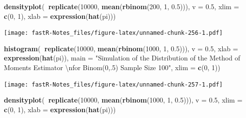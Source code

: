\documentclass[]{book}
\newenvironment{Shaded}{\begin{snugshade}}{\end{snugshade}}
\newcommand{\KeywordTok}[1]{\textcolor[rgb]{0.13,0.29,0.53}{\textbf{#1}}}
\newcommand{\DataTypeTok}[1]{\textcolor[rgb]{0.13,0.29,0.53}{#1}}
\newcommand{\DecValTok}[1]{\textcolor[rgb]{0.00,0.00,0.81}{#1}}
\newcommand{\FloatTok}[1]{\textcolor[rgb]{0.00,0.00,0.81}{#1}}
\newcommand{\CharTok}[1]{\textcolor[rgb]{0.31,0.60,0.02}{#1}}
\newcommand{\StringTok}[1]{\textcolor[rgb]{0.31,0.60,0.02}{#1}}
\newcommand{\OperatorTok}[1]{\textcolor[rgb]{0.81,0.36,0.00}{\textbf{#1}}}
\newcommand{\NormalTok}[1]{#1}
\theoremstyle{definition}
\theoremstyle{definition}
\theoremstyle{definition}
\theoremstyle{remark}
\begin{document}
\begin{Shaded}
\begin{Highlighting}[]
\KeywordTok{densityplot}\NormalTok{(}\OperatorTok{~}\KeywordTok{replicate}\NormalTok{(}\DecValTok{10000}\NormalTok{, }\KeywordTok{mean}\NormalTok{(}\KeywordTok{rbinom}\NormalTok{(}\DecValTok{200}\NormalTok{, }\DecValTok{1}\NormalTok{, }\FloatTok{0.5}\NormalTok{))), }\DataTypeTok{v =} \FloatTok{0.5}\NormalTok{, }\DataTypeTok{xlim =} \KeywordTok{c}\NormalTok{(}\DecValTok{0}\NormalTok{, }
    \DecValTok{1}\NormalTok{), }\DataTypeTok{xlab =} \KeywordTok{expression}\NormalTok{(}\KeywordTok{hat}\NormalTok{(pi)))}
\end{Highlighting}
\end{Shaded}

\texttt{[image: fastR-Notes\_files/figure-latex/unnamed-chunk-256-1.pdf]}

\begin{Shaded}
\begin{Highlighting}[]
\KeywordTok{histogram}\NormalTok{(}\OperatorTok{~}\KeywordTok{replicate}\NormalTok{(}\DecValTok{10000}\NormalTok{, }\KeywordTok{mean}\NormalTok{(}\KeywordTok{rbinom}\NormalTok{(}\DecValTok{1000}\NormalTok{, }\DecValTok{1}\NormalTok{, }\FloatTok{0.5}\NormalTok{))), }\DataTypeTok{v =} \FloatTok{0.5}\NormalTok{, }\DataTypeTok{xlab =} \KeywordTok{expression}\NormalTok{(}\KeywordTok{hat}\NormalTok{(pi)), }
    \DataTypeTok{main =} \StringTok{"Simulation of the Distribution of the Method of Moments Estimator }\CharTok{\textbackslash{}n}\StringTok{for Binom(0,.5) Sample Size 100"}\NormalTok{, }
    \DataTypeTok{xlim =} \KeywordTok{c}\NormalTok{(}\DecValTok{0}\NormalTok{, }\DecValTok{1}\NormalTok{))}
\end{Highlighting}
\end{Shaded}

\texttt{[image: fastR-Notes\_files/figure-latex/unnamed-chunk-257-1.pdf]}

\begin{Shaded}
\begin{Highlighting}[]
\KeywordTok{densityplot}\NormalTok{(}\OperatorTok{~}\KeywordTok{replicate}\NormalTok{(}\DecValTok{10000}\NormalTok{, }\KeywordTok{mean}\NormalTok{(}\KeywordTok{rbinom}\NormalTok{(}\DecValTok{1000}\NormalTok{, }\DecValTok{1}\NormalTok{, }\FloatTok{0.5}\NormalTok{))), }\DataTypeTok{v =} \FloatTok{0.5}\NormalTok{, }\DataTypeTok{xlim =} \KeywordTok{c}\NormalTok{(}\DecValTok{0}\NormalTok{, }
    \DecValTok{1}\NormalTok{), }\DataTypeTok{xlab =} \KeywordTok{expression}\NormalTok{(}\KeywordTok{hat}\NormalTok{(pi)))}
\end{Highlighting}
\end{Shaded}
\end{document}
